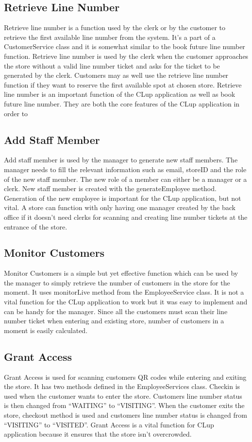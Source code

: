 \subsection{Retrieve Line Number}
Retrieve line number is a function used by the clerk or by the customer to retrieve the first available line number from the system.
It’s a part of a CustomerService class and it is somewhat similar to the book future line number function.
Retrieve line number is used by the clerk when the customer approaches the store without a valid line number ticket and asks for the ticket to be generated by the clerk.
Customers may as well use the retrieve line number function if they want to reserve the first available spot at chosen store.
Retrieve line number is an important function of the CLup application as well as book future line number. They are both the core features of the CLup application in order to

\subsection{Add Staff Member}
Add staff member is used by the manager to generate new staff members. The manager needs to fill the relevant information such as email, storeID and the role of the new staff member.
The new role of a member can either be a manager or a clerk. New staff member is created with the generateEmployee method.
Generation of the new employee is important for the CLup application, but not vital.
A store can function with only having one manager created by the back office if it doesn’t need clerks for scanning and creating line number tickets at the entrance of the store.

\subsection{Monitor Customers}
Monitor Customers is a simple but yet effective function which can be used by the manager to simply retrieve the number of customers in the store for the moment.
It uses monitorLive method from the EmployeeService class. It is not a vital function for the CLup application to work but it was easy to implement and can be handy for the manager.
Since all the customers must scan their line number ticket when entering and existing store, number of customers in a moment is easily calculated.

\subsection{Grant Access}
Grant Access is used for scanning customers QR codes while entering and exiting the store. It has two methods defined in the EmployeeServices class.
Checkin is used when the customer wants to enter the store. Customers line number status is then changed from “WAITING” to “VISITING”. When the customer exits the store,
checkout method is used and customers line number status is changed from “VISITING” to “VISITED”.
Grant Access is a vital function for CLup application because it ensures that the store isn’t overcrowded.
